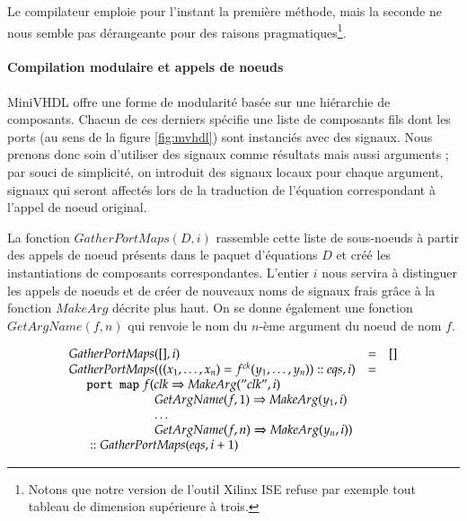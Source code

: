 \documentclass[9pt,a4paper]{article}
\newcommand{\mybox}[1]{\mbox{\tt{#1}}}
\newcommand{\ind}[0]{\hspace{0.5cm}}
\newcommand{\Cons}[0]{\; \mathbf{::} \;}
\newcommand{\App}[2]{#1^{ck}(#2)}
\begin{document}
Le compilateur emploie pour l'instant la première méthode, mais la seconde ne
nous semble pas dérangeante pour des raisons pragmatiques\footnote{Notons que
  notre version de l'outil Xilinx ISE refuse par exemple tout tableau de
  dimension supérieure à trois.}.

\paragraph{Compilation modulaire et appels de noeuds}

MiniVHDL offre une forme de modularité basée sur une hiérarchie de
composants. Chacun de ces derniers spécifie une liste de composants fils dont
les ports (au sens de la figure \ref{fig:mvhdl}) sont instanciés avec des
signaux. Nous prenons donc soin d'utiliser des signaux comme résultats mais
aussi arguments ; par souci de simplicité, on introduit des signaux locaux pour
chaque argument, signaux qui seront affectés lors de la traduction de l'équation
correspondant à l'appel de noeud original.

La fonction $GatherPortMaps(D, i)$ rassemble cette liste de sous-noeuds à partir
des appels de noeud présents dans le paquet d'équations $D$ et créé les
instantiations de composants correspondantes. L'entier $i$ nous servira à
distinguer les appels de noeuds et de créer de nouveaux noms de signaux frais
grâce à la fonction $MakeArg$ décrite plus haut. On se donne également une
fonction $GetArgName(f,n)$ qui renvoie le nom du $n$-ème argument du noeud de
nom $f$.

\newcommand{\GPM}[2]{GatherPortMaps(#1,#2)}
\newcommand{\GAN}[2]{GetArgName(#1,#2)}

\[
\begin{array}{lcl}
  \GPM{[]}{i} & = & [] \\
  \GPM{((x_1,\dots,x_n) = \App{f}{y_1,\dots,y_n}) \Cons eqs}{i} & = &
  \\
  \ind \mybox{port map} \; f ( clk \Rightarrow \MA{"clk"}{i} \\
  \ind \ind \ind \ind \hspace{0.4cm} \GAN{f}{1} \Rightarrow \MA{y_1}{i} \\
  \ind \ind \ind \ind \hspace{0.4cm} \dots \\
  \ind \ind \ind \ind \hspace{0.4cm} \GAN{f}{n} \Rightarrow \MA{y_n}{i}) \\
  \ind \Cons \GPM{eqs}{i + 1}
\end{array}
\]
\end{document}
